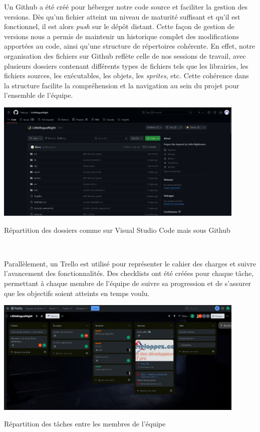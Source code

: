 \documentclass[10pt]{article}
\begin{document}
Un \gls{Github} a été créé pour héberger notre code source et faciliter la gestion des versions. Dès qu'un fichier atteint un niveau de maturité suffisant et qu'il est fonctionnel, il est alors \textit{\gls{push}} sur le dépôt distant. Cette façon de gestion de versions nous a permis de maintenir un historique complet des modifications apportées au code, ainsi qu'une structure de répertoires cohérente. En effet, notre organisation des fichiers sur \gls{Github} reflète celle de nos sessions de travail, avec plusieurs dossiers contenant différents types de fichiers tels que les librairies, les fichiers sources, les exécutables, les objets, les \textit{\gls{sprites}}, etc. Cette cohérence dans la structure facilite la compréhension et la navigation au sein du projet pour l'ensemble de l'équipe.
\\
\begin{center}
\centering
\includegraphics[width=12cm]{Github.png}
\caption{Répartition des dossiers comme sur Visual Studio Code mais sous Github}
\label{fig1}\\
\end{center}
Parallèlement, un \gls{Trello} est utilisé pour représenter le cahier des charges et suivre l'avancement des fonctionnalités. Des checklists ont été créées pour chaque tâche, permettant à chaque membre de l'équipe de suivre sa progression et de s'assurer que les objectifs soient atteints en temps voulu.\\
\begin{center}
\centering
\includegraphics[width=12cm]{Trello.png}
\caption{Répartition des tâches entre les membres de l'équipe}
\label{fig2}\\
\end{center}
\end{document}
